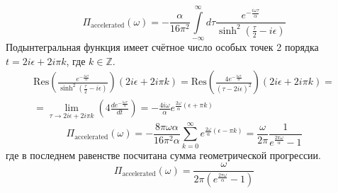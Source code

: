 \documentclass[12pt]{article}
\begin{document}
\begin{enumerate}
    \begin{equation}
        \Pi_\text{accelerated}(\omega)=-\frac{\alpha}{16\pi^2}\int\limits_{-\infty}^\infty d\tau\frac{e^{-\frac{i\omega\tau}{\alpha}}}{\sinh^2(\frac{\tau}{2}-i\epsilon)}
    \end{equation}
    Подынтегральная функция имеет счётное число особых точек 2 порядка $t=2i\epsilon+2i\pi k$, где $k\in\mathbb{Z}$.
    \begin{multline}
        \text{Res}\left(\frac{e^{-\frac{i\omega\tau}{\alpha}}}{\sinh^2(\frac{\tau}{2}-i\epsilon)}\right)(2i\epsilon+2i\pi k)=\text{Res}\left(\frac{4e^{-\frac{i\omega\tau}{\alpha}}}{(\tau-2i\epsilon)^2}\right)(2i\epsilon+2i\pi k)=\\
        =\lim\limits_{\tau\rightarrow 2i\epsilon+2i\pi k}\left(4\frac{de^{-\frac{i\omega\tau}{\alpha}}}{dt}\right)=-\frac{4i\omega}{\alpha}e^{\frac{2\omega}{\alpha}(\epsilon+\pi k)}
    \end{multline}
    \begin{equation}
        \Pi_\text{accelerated}(\omega)=-\frac{8\pi\omega\alpha}{16\pi^2\alpha}\sum\limits_{k=0}^\infty e^{\frac{2\omega}{\alpha}(\epsilon-\pi k)}=\frac{\omega}{2\pi}\frac{1}{e^{\frac{2\pi\omega}{\alpha}}-1}
    \end{equation}
    где в последнем равенстве посчитана сумма геометрической прогрессии.
    \begin{equation}
        \boxed{\Pi_\text{accelerated}(\omega)=\frac{\omega}{2\pi(e^{\frac{2\pi\omega}{\alpha}}-1)}}
    \end{equation}
\end{enumerate}
\end{document}
